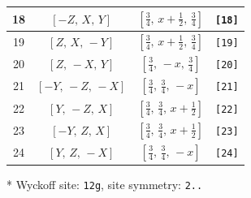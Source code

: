\documentclass[fleqn,8pt]{jsarticle}
\begin{document}
\begin{longtable}{cccc}
18 & $\left[ - Z,\, X,\, Y \right]$ & $\left[ \frac{3}{4},\, x + \frac{1}{2},\, \frac{3}{4} \right]$ & {\tt [18]} \\ \hline
19 & $\left[ Z,\, X,\, - Y \right]$ & $\left[ \frac{3}{4},\, x + \frac{1}{2},\, \frac{3}{4} \right]$ & {\tt [19]} \\ \hline
20 & $\left[ Z,\, - X,\, Y \right]$ & $\left[ \frac{3}{4},\, - x,\, \frac{3}{4} \right]$ & {\tt [20]} \\ \hline
21 & $\left[ - Y,\, - Z,\, - X \right]$ & $\left[ \frac{3}{4},\, \frac{3}{4},\, - x \right]$ & {\tt [21]} \\ \hline
22 & $\left[ Y,\, - Z,\, X \right]$ & $\left[ \frac{3}{4},\, \frac{3}{4},\, x + \frac{1}{2} \right]$ & {\tt [22]} \\ \hline
23 & $\left[ - Y,\, Z,\, X \right]$ & $\left[ \frac{3}{4},\, \frac{3}{4},\, x + \frac{1}{2} \right]$ & {\tt [23]} \\ \hline
24 & $\left[ Y,\, Z,\, - X \right]$ & $\left[ \frac{3}{4},\, \frac{3}{4},\, - x \right]$ & {\tt [24]} \\
\end{longtable}
* Wyckoff site: {\tt 12g}, site symmetry: {\tt 2..}
\renewcommand{\arraystretch}{1.2}
\end{document}
